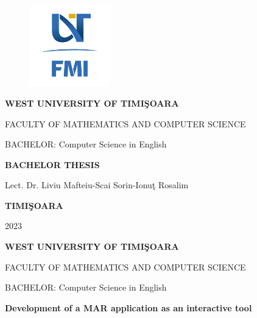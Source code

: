 \documentclass[12pt,a4paper]{book}
\theoremstyle{definition}
\theoremstyle{remark}
\begin{document}
\sloppy

\thispagestyle{empty}

\begin{center}
    \begin{figure}[h!]
        \vspace{-20pt}
        \begin{center}
            \includegraphics[width=100pt]{img/FMI-03.png}
        \end{center}
    \end{figure}


    {\large{\bf WEST UNIVERSITY OF TIMI\c SOARA

        FACULTY OF MATHEMATICS AND COMPUTER SCIENCE

        BACHELOR:  Computer Science in English}}

    \vspace{120pt}
    {\huge {\bf BACHELOR THESIS}}

    \vspace{160pt}
\end{center}

{\large{}

\noindent Lect. Dr. Liviu Mafteiu-Scai\hfill
\noindent Sorin-Ionu\c t Rosalim
}

\vfill
\begin{center}
    {\bf TIMI\c SOARA

        2023}
\end{center}
\newpage
\thispagestyle{empty}
\begin{center}
    {\large{\bf WEST UNIVERSITY OF TIMI\c SOARA

            FACULTY OF MATHEMATICS AND COMPUTER SCIENCE

            BACHELOR:  Computer Science in English}}

    \vspace{200pt}
    {\huge {\bf Development of a \ac{MAR} application as an interactive tool}}

    \vspace{153pt}
\end{center}
\end{document}
